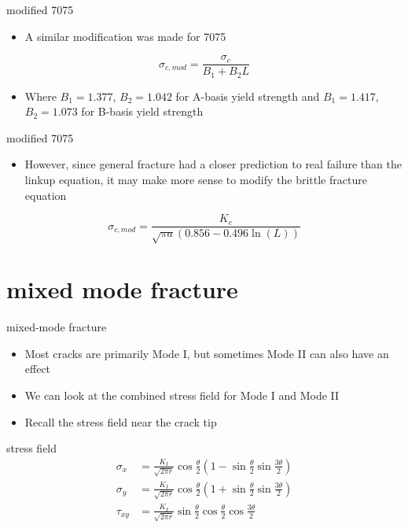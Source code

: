 \documentclass[
  letterpaper,
  ignorenonframetext,
  aspectratio=43,
  handout,
  12pt]{beamer}
\providecommand{\tightlist}{%
  \setlength{\itemsep}{0pt}\setlength{\parskip}{0pt}}
\providecommand{\tightlist}{%
\setlength{\itemsep}{0pt}\setlength{\parskip}{0pt}}
\begin{document}
\begin{frame}{modified 7075}
\protect\hypertarget{modified-7075}{}
\begin{itemize}
\tightlist
\item
  A similar modification was made for 7075
\end{itemize}

\[\sigma_{c,mod} = \frac{\sigma_c}{B_1 + B_2 L}\]

\begin{itemize}
\tightlist
\item
  Where \(B_1=1.377\), \(B_2=1.042\) for A-basis yield strength and
  \(B_1=1.417\), \(B_2=1.073\) for B-basis yield strength
\end{itemize}
\end{frame}

\begin{frame}{modified 7075}
\protect\hypertarget{modified-7075-1}{}
\begin{itemize}
\tightlist
\item
  However, since general fracture had a closer prediction to real
  failure than the linkup equation, it may make more sense to modify the
  brittle fracture equation
\end{itemize}

\[\sigma_{c,mod} = \frac{K_c}{\sqrt{\pi a} (0.856 - 0.496 \ln(L))}\]
\end{frame}

\hypertarget{mixed-mode-fracture}{%
\section{mixed mode fracture}\label{mixed-mode-fracture}}

\begin{frame}{mixed-mode fracture}
\protect\hypertarget{mixed-mode-fracture-1}{}
\begin{itemize}
\tightlist
\item
  Most cracks are primarily Mode I, but sometimes Mode II can also have
  an effect
\item
  We can look at the combined stress field for Mode I and Mode II
\item
  Recall the stress field near the crack tip
\end{itemize}
\end{frame}

\begin{frame}{stress field}
\protect\hypertarget{stress-field}{}
\[\begin{aligned}
  \sigma_x &= \frac{K_I}{\sqrt{2\pi r}} \cos \frac{\theta}{2} \left(1-\sin \frac{\theta}{2}\sin \frac{3\theta}{2}\right)\\
  \sigma_y &= \frac{K_I}{\sqrt{2\pi r}} \cos \frac{\theta}{2} \left(1+\sin \frac{\theta}{2}\sin \frac{3\theta}{2}\right)\\
  \tau_{xy} &= \frac{K_I}{\sqrt{2\pi r}} \sin \frac{\theta}{2} \cos \frac{\theta}{2}\cos \frac{3\theta}{2}
\end{aligned}\]
\end{frame}
\end{document}
